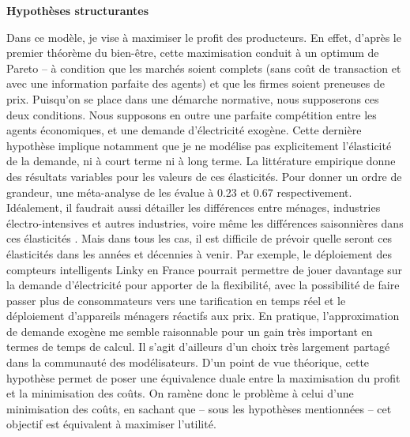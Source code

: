 \textbf{Hypothèses structurantes}

Dans ce modèle, je vise à maximiser le profit des producteurs. En effet, d’après le premier théorème du bien-être, cette maximisation conduit à un optimum de Pareto – à condition que les marchés soient complets (sans coût de transaction et avec une information parfaite des agents) et que les firmes soient preneuses de prix. Puisqu’on se place dans une démarche normative, nous supposerons ces deux conditions. 
Nous supposons en outre une parfaite compétition entre les agents économiques, et une demande d’électricité exogène. Cette dernière hypothèse implique notamment que je ne modélise pas explicitement l'élasticité de la demande, ni à court terme ni à long terme. La littérature empirique donne des résultats variables pour les valeurs de ces élasticités. Pour donner un ordre de grandeur, une méta-analyse de \citet{Labandeira2016} les évalue à 0.23 et 0.67 respectivement. Idéalement, il faudrait aussi détailler les différences entre ménages, industries électro-intensives et autres industries, voire même les différences saisonnières dans ces élasticités \citep{Fan2011}. Mais dans tous les cas, il est difficile de prévoir quelle seront ces élasticités dans les années et décennies à venir. Par exemple, le déploiement des compteurs intelligents Linky en France pourrait permettre de jouer davantage sur la demande d'électricité pour apporter de la flexibilité, avec la possibilité de faire passer plus de consommateurs vers une tarification en temps réel et le déploiement d'appareils ménagers réactifs aux prix.
En pratique, l'approximation de demande exogène me semble raisonnable pour un gain très important en termes de temps de calcul. Il s'agit d'ailleurs d'un choix très largement partagé dans la communauté des modélisateurs. D’un point de vue théorique, cette hypothèse permet de poser une équivalence duale entre la maximisation du profit et la minimisation des coûts. 
On ramène donc le problème à celui d’une minimisation des coûts, en sachant que – sous les hypothèses mentionnées – cet objectif est équivalent à maximiser l’utilité.

